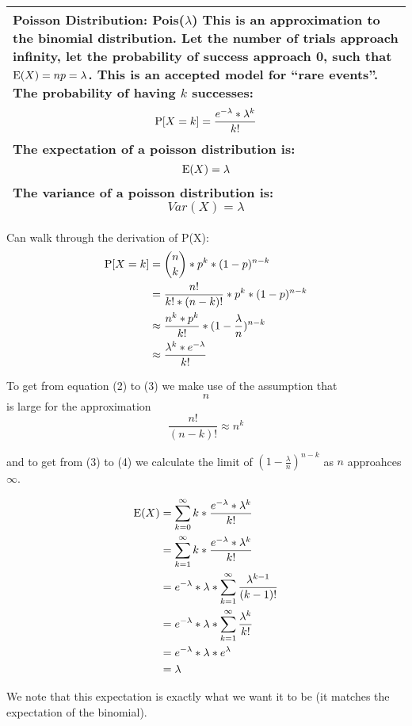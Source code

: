 {\tabulinesep=1mm
\begin{tabu}{|p{16cm} |}
\hline
\vspace{2 mm}
\textbf{Poisson Distribution: Pois($\lambda$)}
This is an approximation to the binomial distribution. Let the number 
of trials approach infinity, let the probability of success approach 0, 
such that $\E(X) = np = \lambda$.  This is an accepted model for 
“rare events”. The probability of having $k$ successes:
\[ \P[X = k] = \frac{e^{-\lambda} * \lambda^k}{k!} \]
The expectation of a poisson distribution is:
\[ \E(X) = \lambda \]
The variance of a poisson distribution is:
\[ Var(X) = \lambda \]
\vspace{5 mm}
\\
\hline
\end{tabu}
}

\begin{solution} %
Can walk through the derivation of P(X):
\begin{align}
\P[X = k] &= {n \choose k} * p^k * (1 - p)^{n - k} \\ 
&= \frac{n!}{k! * (n - k)!} * p^k * (1 - p)^{n - k} \\
&\approx \frac{n^k * p^k}{k!} * (1 - \frac{\lambda}{n})^{n-k} \\
&\approx \frac{\lambda^k * e^{-\lambda}}{k!}
\end{align}

To get from equation (2) to (3) we make use of the assumption that $$n$$ is large for the approximation 
\[ \frac{n!}{(n-k)!} \approx n^k \] 

and to get from (3) to (4) we calculate the limit of $(1 - \frac{\lambda}{n})^{n-k}$ as $n$ approahces $\infty$.  

\begin{align*}
\E(X) &= \sum_{k = 0}^{\infty} k* \frac{e^{-\lambda} * \lambda^k}{k!} \\ \nonumber
&= \sum_{k = 1}^{\infty}k * \frac{e^{-\lambda} * \lambda^k}{k!} \\
&= e^{-\lambda} * \lambda * \sum_{k = 1}^{\infty} \frac{\lambda^{k - 1}}{(k - 1)!} \\
&=  e^{-\lambda} * \lambda * \sum_{k = 1}^{\infty} \frac{\lambda^{k}}{k!} \\
&= e^{-\lambda} * \lambda * e^{\lambda} \\
&= \lambda 
\end{align*}

We note that this expectation is exactly what we want it to be (it matches the expectation of the binomial). 

\end{solution}